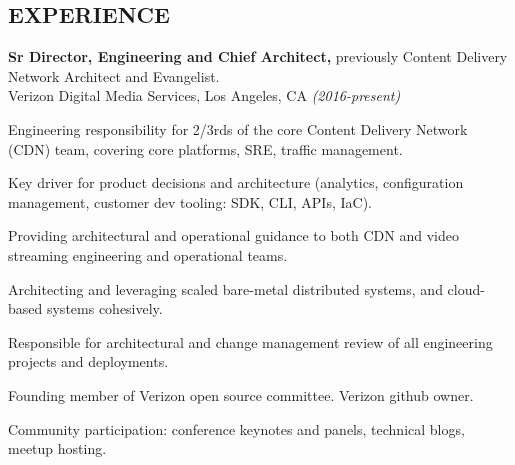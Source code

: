 \documentclass[margin]{res}
\begin{document}
\begin{resume}


\section{EXPERIENCE}
\noindent

{\bf Sr Director, Engineering and Chief Architect,} previously Content Delivery Network Architect and Evangelist.\\
Verizon Digital Media Services, Los Angeles, CA {\em (2016-present)}
\begin{list}{}{\leftmargin=1.5em \topsep=5pt \partopsep=0pt \parsep=2.5pt}
  \item Engineering responsibility for 2/3rds of the core Content Delivery Network (CDN) team, covering core platforms, SRE, traffic management.
  \item Key driver for product decisions and architecture (analytics, configuration management, customer dev tooling: SDK, CLI, APIs, IaC).
  \item Providing architectural and operational guidance to both CDN and video streaming engineering and operational teams.
  \item Architecting and leveraging scaled bare-metal distributed systems, and cloud-based systems cohesively.
  \item Responsible for architectural and change management review of all engineering projects and deployments.
  \item Founding member of Verizon open source committee.  Verizon github owner.
  \item Community participation: conference keynotes and panels, technical blogs, meetup hosting.
\end{list}


\end{resume}
\end{document}
